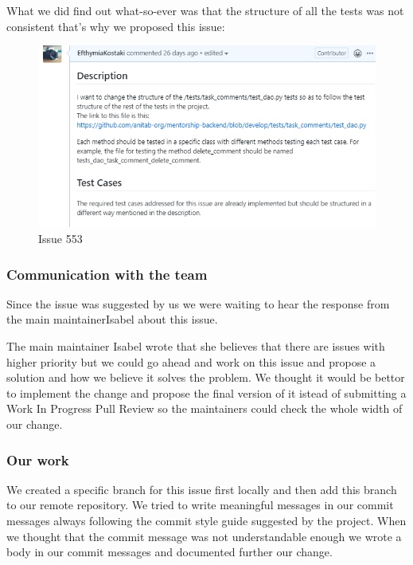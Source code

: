 \documentclass{article}
\begin{document}
What we did find out what-so-ever was that the structure of all the tests was not consistent that's why we proposed this issue:
 
\begin{figure}[tph!]
\centerline{\includegraphics[totalheight=7cm, width=15cm]{issue553.png}}
    \caption{Issue 553}
    \label{fig:verticalcell}
\end{figure}
\vfill
\clearpage

\subsubsection{Communication with the team}
\hspace{0.5cm}Since the issue was suggested by us we were waiting to hear the response from the main maintainerIsabel about this issue.

The main maintainer Isabel wrote that she believes that there are issues with higher priority but we could go ahead and work on this issue and propose a solution and how we believe it solves the problem. We thought it would be bettor to implement the change and propose the final version of it istead of submitting a Work In Progress Pull Review so the maintainers could check the whole width of our change.
\subsubsection{Our work}
\hspace{0.5cm}We created a specific branch for this issue first locally and then add this branch to our remote repository. We tried to write meaningful messages in our commit messages always following the commit style guide suggested by the project. When we thought that the commit message was not understandable enough we wrote a body in our commit messages and documented further our change.
\end{document}
